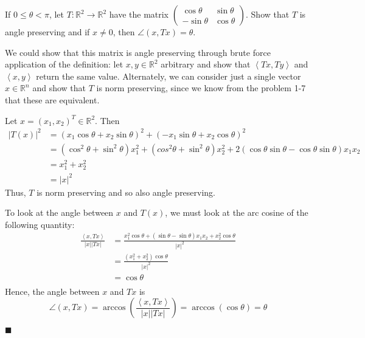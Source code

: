 \documentclass[12pt]{article}
\renewcommand{\qed}{\hfill$\blacksquare$}
\renewenvironment{proof}{\begin{addmargin}[1em]{0em}\begin{newproof}}{\end{newproof}\end{addmargin}\qed}
\newenvironment{problem}[2][Problem]{\begin{trivlist}
\item[\hskip \labelsep {\bfseries #1}\hskip \labelsep {\bfseries #2.}]}{\end{trivlist}}
\begin{document}
\begin{problem}{1-9}
If $0 \leq \theta < \pi$, let $T: \mathbb{R}^2 \rightarrow \mathbb{R}^2$ have the matrix $\left( \begin{array}{rr} \cos \theta & \sin \theta \\ -\sin \theta & \cos \theta \end{array} \right)$. Show that $T$ is angle preserving and if $x\neq 0$, then $\angle \left(x, Tx\right) = \theta $.
\end{problem}

\begin{proof}
We could show that this matrix is angle preserving through brute force application of the definition: let $x,y \in \mathbb{R}^2$ arbitrary and show that $\left\langle Tx,Ty\right\rangle$ and $\left\langle x,y \right\rangle$ return the same value. Alternately, we can consider just a single vector $x\in \mathbb{R}^n$ and show that $T$ is norm preserving, since we know from the problem 1-7 that these are equivalent.

Let $x = \left(x_1,x_2\right)^T \in \mathbb{R}^2$. Then 
\begin{equation*}
\begin{split}
\left| T\left(x\right)\right|^2 & = \left(x_1 \cos \theta + x_2 \sin \theta \right)^2 + \left(-x_1 \sin \theta + x_2 \cos \theta \right)^2  \\ 
& = \left(\cos^2 \theta + \sin^2 \theta \right) x_1^2 + \left(cos^2 \theta + \sin^2 \theta \right) x_2^2 + 2\left(\cos \theta \sin \theta - \cos \theta \sin \theta \right) x_1 x_2 \\
& = x_1^2 + x_2^2 \\
& = \left|x\right|^2
\end{split}
\end{equation*}
Thus, $T$ is norm preserving and so also angle preserving. 

To look at the angle between $x$ and $T\left(x\right)$, we must look at the arc cosine of the following quantity:
\begin{equation*}
\begin{split}
\frac{\left\langle x,Tx\right\rangle}{\left|x\right|\left|Tx\right|} & = \frac{x_1^2 \cos \theta +\left(\sin \theta - \sin \theta\right)x_1x_2 + x_2^2 \cos \theta}{\left|x\right|^2}\\
& = \frac{\left(x_1^2 + x_2^2\right) \cos \theta}{\left|x\right|^2} \\
& = \cos \theta \\
\end{split}
\end{equation*}
Hence, the angle between $x$ and $Tx$ is
\begin{equation*}
\angle \left(x,Tx\right) = \arccos \left( \frac{\left\langle x, Tx\right\rangle }{\left|x\right|\left|Tx\right|} \right) = \arccos \left(\cos \theta \right) = \theta 
\end{equation*}
\end{proof}
\end{document}
